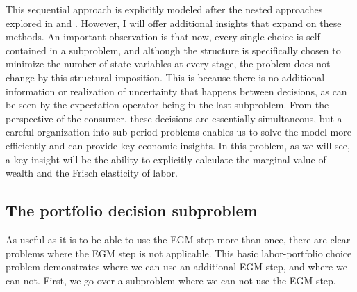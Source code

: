 \documentclass[\econtexRoot/SequentialEGM]{subfiles}
\begin{document}
This sequential approach is explicitly modeled after the nested approaches explored in  \cite{Clausen2020} and \cite{Druedahl2021}. However, I will offer additional insights that expand on these methods. An important observation is that now, every single choice is self-contained in a subproblem, and although the structure is specifically chosen to minimize the number of state variables at every stage, the problem does not change by this structural imposition. This is because there is no additional information or realization of uncertainty that happens between decisions, as can be seen by the expectation operator being in the last subproblem. From the perspective of the consumer, these decisions are essentially simultaneous, but a careful organization into sub-period problems enables us to solve the model more efficiently and can provide key economic insights. In this problem, as we will see, a key insight will be the ability to explicitly calculate the marginal value of wealth and the Frisch elasticity of labor.

%

\subsection{The portfolio decision subproblem}

As useful as it is to be able to use the EGM step more than once, there are clear problems where the EGM step is not applicable. This basic labor-portfolio choice problem demonstrates where we can use an additional EGM step, and where we can not. First, we go over a subproblem where we can not use the EGM step.
\end{document}
